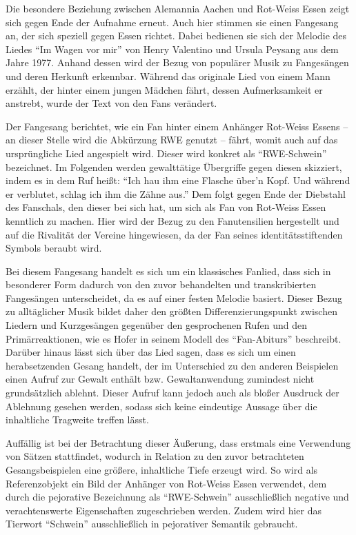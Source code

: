 Die besondere Beziehung zwischen Alemannia Aachen und Rot-Weiss Essen zeigt sich gegen Ende der Aufnahme erneut.
Auch hier stimmen sie einen Fangesang an, der sich speziell gegen Essen richtet.
Dabei bedienen sie sich der Melodie des Liedes "`Im Wagen vor mir"' von Henry Valentino und Ursula Peysang aus dem Jahre 1977.
Anhand dessen wird der Bezug von populärer Musik zu Fangesängen und deren Herkunft erkennbar.
Während das originale Lied von einem Mann erzählt, der hinter einem jungen Mädchen fährt, dessen Aufmerksamkeit er anstrebt, wurde der Text von den Fans verändert.

Der Fangesang berichtet, wie ein Fan hinter einem Anhänger Rot-Weiss Essens – an dieser Stelle wird die Abkürzung RWE genutzt – fährt, womit auch auf das ursprüngliche Lied angespielt wird.
Dieser wird konkret als "`RWE-Schwein"' bezeichnet.
Im Folgenden werden gewalttätige Übergriffe gegen diesen skizziert, indem es in dem Ruf heißt:
"`Ich hau ihm eine Flasche über'n Kopf.
Und während er verblutet, schlag ich ihm die Zähne aus."'
Dem folgt gegen Ende der Diebstahl des Fanschals, den dieser bei sich hat, um sich als Fan von Rot-Weiss Essen kenntlich zu machen.
Hier wird der Bezug zu den Fanutensilien hergestellt und auf die Rivalität der Vereine hingewiesen, da der Fan seines identitätsstiftenden Symbols beraubt wird.

Bei diesem Fangesang handelt es sich um ein klassisches Fanlied, dass sich in besonderer Form dadurch von den zuvor behandelten und transkribierten Fangesängen unterscheidet, da es auf einer festen Melodie basiert.
Dieser Bezug zu alltäglicher Musik bildet daher den größten Differenzierungspunkt zwischen Liedern und Kurzgesängen gegenüber den gesprochenen Rufen und den Primärreaktionen, wie es Hofer in seinem Modell des "`Fan-Abiturs"' beschreibt\cite[S. 15]{RK98}.
Darüber hinaus lässt sich über das Lied sagen, dass es sich um einen herabsetzenden Gesang handelt, der im Unterschied zu den anderen Beispielen einen Aufruf zur Gewalt enthält bzw. Gewaltanwendung zumindest nicht grundsätzlich ablehnt.
Dieser Aufruf kann jedoch auch als bloßer Ausdruck der Ablehnung gesehen werden, sodass sich keine eindeutige Aussage über die inhaltliche Tragweite treffen lässt.

Auffällig ist bei der Betrachtung dieser Äußerung, dass erstmals eine Verwendung von Sätzen stattfindet, wodurch in Relation zu den zuvor betrachteten Gesangsbeispielen eine größere, inhaltliche Tiefe erzeugt wird.
So wird als Referenzobjekt ein Bild der Anhänger von Rot-Weiss Essen verwendet, dem durch die pejorative Bezeichnung als "`RWE-Schwein"' ausschließlich negative und verachtenswerte Eigenschaften zugeschrieben werden\cite{Dud15}.
Zudem wird hier das Tierwort "`Schwein"' ausschließlich in pejorativer Semantik gebraucht.

